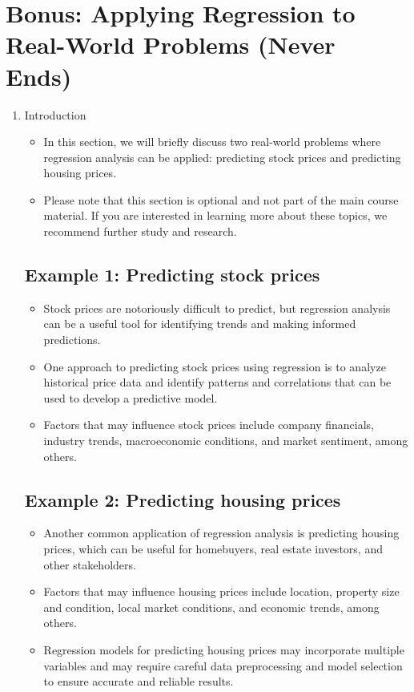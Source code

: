 \documentclass{article}
\begin{document}
\section{Bonus: Applying Regression to Real-World Problems (Never Ends)}
\begin{enumerate}[label=\alph*)]
\item Introduction
\begin{itemize}
\item In this section, we will briefly discuss two real-world problems where regression analysis can be applied: predicting stock prices and predicting housing prices.
\item Please note that this section is optional and not part of the main course material. If you are interested in learning more about these topics, we recommend further study and research.
\end{itemize}
\subsection*{Example 1: Predicting stock prices} 
\begin{itemize}
    \item Stock prices are notoriously difficult to predict, but regression analysis can be a useful tool for identifying trends and making informed predictions.
    \item One approach to predicting stock prices using regression is to analyze historical price data and identify patterns and correlations that can be used to develop a predictive model.
    \item Factors that may influence stock prices include company financials, industry trends, macroeconomic conditions, and market sentiment, among others.
\end{itemize}

\subsection*{Example 2: Predicting housing prices}
\begin{itemize}
    \item Another common application of regression analysis is predicting housing prices, which can be useful for homebuyers, real estate investors, and other stakeholders.
    \item Factors that may influence housing prices include location, property size and condition, local market conditions, and economic trends, among others.
    \item Regression models for predicting housing prices may incorporate multiple variables and may require careful data preprocessing and model selection to ensure accurate and reliable results.
\end{itemize}


\end{enumerate}
\end{document}
